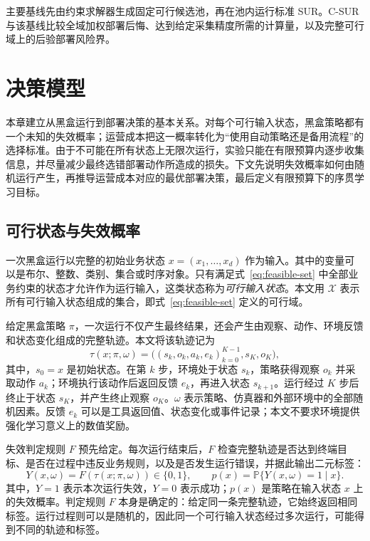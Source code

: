 \documentclass[UTF8,11pt,a4paper,fontset=none]{ctexart}
\newcommand{\X}{\mathcal X}
\newcommand{\Pp}{\mathbb P}
\newcommand{\1}{\mathbf 1}
\begin{document}
主要基线先由约束求解器生成固定可行候选池，再在池内运行标准 SUR。C-SUR 与该基线比较全域加权部署后悔、达到给定采集精度所需的计算量，以及完整可行域上的后验部署风险界。

\section{决策模型}

本章建立从黑盒运行到部署决策的基本关系。对每个可行输入状态，黑盒策略都有一个未知的失效概率；运营成本把这一概率转化为“使用自动策略还是备用流程”的选择标准。由于不可能在所有状态上无限次运行，实验只能在有限预算内逐步收集信息，并尽量减少最终选错部署动作所造成的损失。下文先说明失效概率如何由随机运行产生，再推导运营成本对应的最优部署决策，最后定义有限预算下的序贯学习目标。

\subsection{可行状态与失效概率}

一次黑盒运行以完整的初始业务状态 $x=(x_1,\ldots,x_d)$ 作为输入。其中的变量可以是布尔、整数、类别、集合或时序对象。只有满足式~\eqref{eq:feasible-set} 中全部业务约束的状态才允许作为运行输入，这类状态称为\emph{可行输入状态}。本文用 $\X$ 表示所有可行输入状态组成的集合，即式~\eqref{eq:feasible-set} 定义的可行域。

给定黑盒策略 $\pi$，一次运行不仅产生最终结果，还会产生由观察、动作、环境反馈和状态变化组成的完整轨迹。本文将该轨迹记为
\begin{equation}
  \tau(x;\pi,\omega)
  =\bigl((s_k,o_k,a_k,e_k)_{k=0}^{K-1},s_K,o_K\bigr),
\end{equation}
其中，$s_0=x$ 是初始状态。在第 $k$ 步，环境处于状态 $s_k$，策略获得观察 $o_k$ 并采取动作 $a_k$；环境执行该动作后返回反馈 $e_k$，再进入状态 $s_{k+1}$。运行经过 $K$ 步后终止于状态 $s_K$，并产生终止观察 $o_K$。$\omega$ 表示策略、仿真器和外部环境中的全部随机因素。反馈 $e_k$ 可以是工具返回值、状态变化或事件记录；本文不要求环境提供强化学习意义上的数值奖励。

失效判定规则 $F$ 预先给定。每次运行结束后，$F$ 检查完整轨迹是否达到终端目标、是否在过程中违反业务规则，以及是否发生运行错误，并据此输出二元标签：
\begin{equation}
  Y(x,\omega)=F\!\left(\tau(x;\pi,\omega)\right)\in\{0,1\},
  \qquad
  p(x)=\Pp\{Y(x,\omega)=1\mid x\}.
  \label{eq:failure-probability}
\end{equation}
其中，$Y=1$ 表示本次运行失效，$Y=0$ 表示成功；$p(x)$ 是策略在输入状态 $x$ 上的失效概率。判定规则 $F$ 本身是确定的：给定同一条完整轨迹，它始终返回相同标签。运行过程则可以是随机的，因此同一个可行输入状态经过多次运行，可能得到不同的轨迹和标签。
\end{document}
